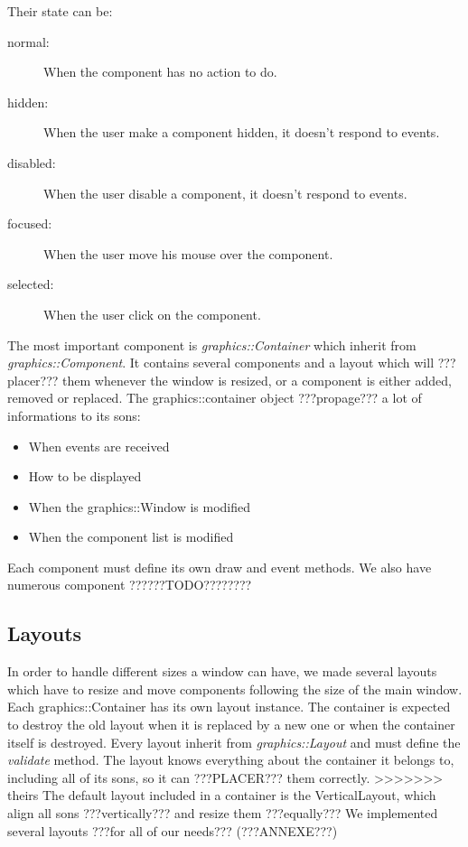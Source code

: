 \documentclass{scrreprt}
\begin{document}
		  Their state can be:
		  \begin{description}
		  \item[normal:]{When the component has no action to do.}
		  \item[hidden:]{When the user make a component hidden, it doesn't respond to events.}
		  \item[disabled:]{When the user disable a component, it doesn't respond to events.}
		  \item[focused:]{When the user move his mouse over the component.}
		  \item[selected:]{When the user click on the component.}
		  \end{description}

		  The most important component is \emph{graphics::Container} which inherit from \emph{graphics::Component}. It contains several components and a layout which will ???placer??? them whenever the window is resized, or a component is either added, removed or replaced. The graphics::container object ???propage??? a lot of informations to its sons:
		  \begin{itemize}
		  \item{When events are received}
		  \item{How to be displayed}
		  \item{When the graphics::Window is modified}
		  \item{When the component list is modified}
		  \end{itemize}

		  Each component must define its own draw and event methods.
		  We also have numerous component ??????TODO????????

		  \subsection{Layouts}
		  In order to handle different sizes a window can have, we made several layouts which have to resize and move components following the size of the main window. Each graphics::Container has its own layout instance. The container is expected to destroy the old layout when it is replaced by a new one or when the container itself is destroyed. Every layout inherit from \emph{graphics::Layout} and must define the \emph{validate} method. 
		  The layout knows everything about the container it belongs to, including all of its sons, so it can ???PLACER??? them correctly.
>>>>>>> theirs
	The default layout included in a container is the VerticalLayout, which align all sons ???vertically??? and resize them ???equally???
We implemented several layouts ???for all of our needs??? (???ANNEXE???)
\end{document}
